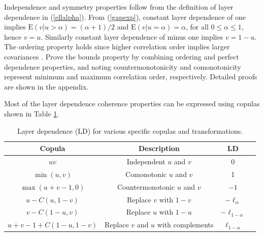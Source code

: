 \documentclass[authoryear]{elsarticle}
\newcommand{\E}{{\mathrm E}}
\newcommand{\eref}[1]{(\ref{#1})}
\newcommand{\aref}[1]{\ref{#1}}
\begin{document}
Independence and symmetry properties follow from the definition of layer dependence in \eref{ellalpha}. From \eref{gapexp}, constant layer dependence of one implies $\E(v|u>\alpha)=(\alpha+1)/2$ and $\E(v|u=\alpha)=\alpha$, for all $0\leq\alpha\leq 1$, hence $v=u$. Similarly constant layer dependence of minus one implies $v=1-u$. The ordering property holds since higher correlation order implies larger covariances \citep{dhaene2009correlation}. Prove the bounds property by combining ordering and perfect dependence properties, and noting countermonotonicity and comonotonicity represent minimum and maximum correlation order, respectively. Detailed proofs are shown in the appendix.


Most of the layer dependence coherence properties can be expressed using copulas shown in Table \aref{table1}.

\begin{table}[h]
  \begin{center}
\begin{tabular}{|c|c|c|c| }
 \hline
 Copula & Description & LD \\
 \hline
 $uv$ & Independent $u$ and $v$ & 0 \\
 $\min(u,v)$ & Comonotonic $u$ and $v$ & 1 \\
 $\max(u+v-1,0)$ & Countermonotonic $u$ and $v$ & $-1$\\
 $u-C(u,1-v)$ & Replace $v$ with $1-v$ & $-\ell_\alpha$ \\
 $v-C(1-u,v)$ & Replace $u$ with $1-u$ & $-\ell_{1-\alpha}$ \\
 $u+v-1+C(1-u,1-v)$ & Replace $v$ and $u$ with complements & $\ell_{1-\alpha}$\\
 \hline
\end{tabular}
\caption{Layer dependence (LD) for various specific copulas and transformations.}\label{table1}
  \end{center}
\end{table}
\end{document}
